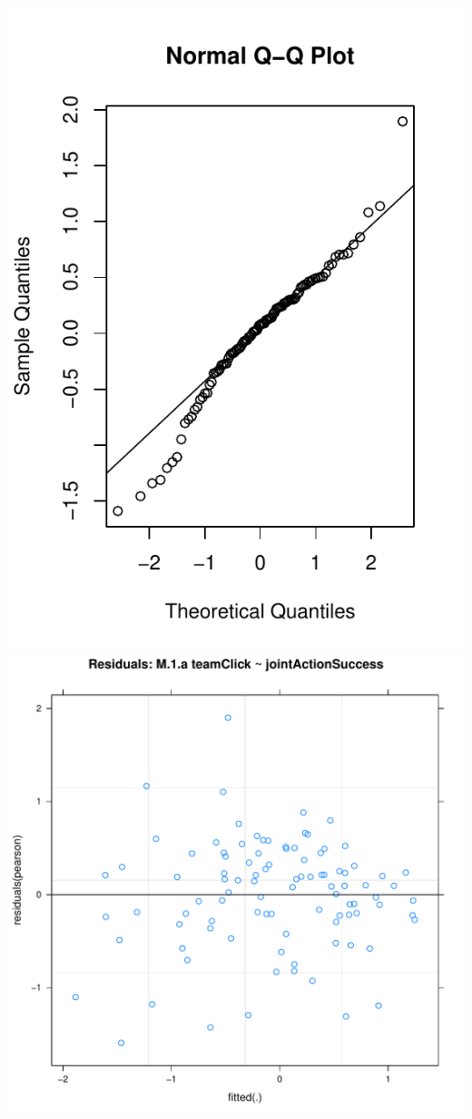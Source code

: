 \documentclass[12pt]{report}
\begin{document}
\includegraphics{../images/MLM1aQQNorm.pdf}
\includegraphics{../images/MLM1aScatter.pdf}
\end{document}
